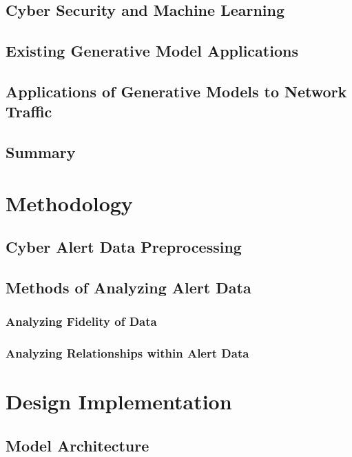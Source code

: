 \documentclass[12pt,american]{report}
\begin{document}

\section{Cyber Security and Machine Learning}

\section{Existing Generative Model Applications}

\section{Applications of Generative Models to Network Traffic}

\section{Summary}

\chapter{Methodology}

\section{Cyber Alert Data Preprocessing}

\section{Methods of Analyzing Alert Data}

\subsection{Analyzing Fidelity of Data}

\subsection{Analyzing Relationships within Alert Data}

\chapter{Design Implementation}

\section{Model Architecture}
\end{document}
